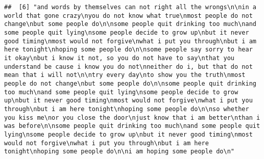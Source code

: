 \documentclass[]{article}
\begin{document}
\begin{verbatim}
##  [6] "and words by themselves can not right all the wrongs\n\nin a world that gone crazy\nyou do not know what true\nmost people do not change\nbut some people do\n\nsome people quit drinking too much\nand some people quit lying\nsome people decide to grow up\nbut it never good timing\nmost would not forgive\nwhat i put you through\nbut i am here tonight\nhoping some people do\n\nsome people say sorry to hear it okay\nbut i know it not, so you do not have to say\nthat you understand be cause i know you do not\nneither do i, but that do not mean that i will not\n\ntry every day\nto show you the truth\nmost people do not change\nbut some people do\n\nsome people quit drinking too much\nand some people quit lying\nsome people decide to grow up\nbut it never good timing\nmost would not forgive\nwhat i put you through\nbut i am here tonight\nhoping some people do\n\nso whether you kiss me\nor you close the door\njust know that i am better\nthan i was before\n\nsome people quit drinking too much\nand some people quit lying\nsome people decide to grow up\nbut it never good timing\nmost would not forgive\nwhat i put you through\nbut i am here tonight\nhoping some people do\n\ni am hoping some people do\n"                                                                                                                                                                                                                                                                                                                                                                                                                                                                                                                                                                                                                                                                                                                                                                                                                                                                                                                                                                                                                                                                                                                                                                                                                                                                                                                                                                                                                                                                                                                                                                                                                                                                                                                        

\end{verbatim}
\end{document}
